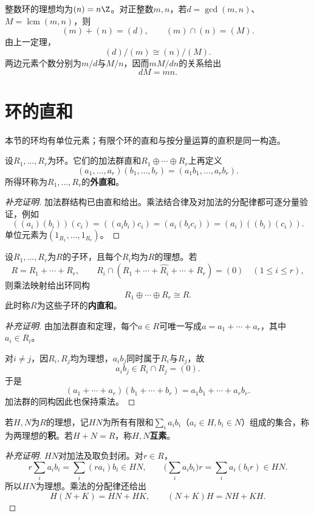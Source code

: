 \begin{example}
整数环的理想均为$(n)=n\Z$。对正整数$m,n$，若$d=\gcd(m,n)$、$M=\operatorname{lcm}(m,n)$，则
\[
(m)+(n)=(d),\qquad (m)\cap(n)=(M).
\]
由上一定理，
\[
(d)/(m)\cong(n)/(M).
\]
两边元素个数分别为$m/d$与$M/n$，因而$mM/dn$的关系给出
\[
dM=mn.
\]
\end{example}

\section{环的直和}

本节的环均有单位元素；有限个环的直和与按分量运算的直积是同一构造。
\begin{definition}
设$R_1,\ldots,R_r$为环。它们的加法群直和$R_1\oplus\cdots\oplus R_r$上再定义
\[
(a_1,\ldots,a_r)(b_1,\ldots,b_r)=(a_1b_1,\ldots,a_rb_r).
\]
所得环称为$R_1,\ldots,R_r$的\textbf{外直和}。
\end{definition}
\begin{proof}[补充证明]
加法群结构已由直和给出。乘法结合律及对加法的分配律都可逐分量验证，例如
\[
((a_i)(b_i))(c_i)=((a_ib_i)c_i)=(a_i(b_ic_i))=(a_i)((b_i)(c_i)).
\]
单位元素为$(1_{R_1},\ldots,1_{R_r})$。
\end{proof}

\begin{theorem}\label{p2:ring-internal-sum}
设$R_1,\ldots,R_r$为$R$的子环，且每个$R_i$均为$R$的理想。若
\[
R=R_1+\cdots+R_r,\qquad
R_i\cap(R_1+\cdots+\widehat{R_i}+\cdots+R_r)=(0)
\quad(1\leq i\leq r),
\]
则乘法映射给出环同构
\[
R_1\oplus\cdots\oplus R_r\cong R.
\]
此时称$R$为这些子环的\textbf{内直和}。
\end{theorem}
\begin{proof}[补充证明]
由加法群直和定理，每个$a\in R$可唯一写成$a=a_1+\cdots+a_r$，其中$a_i\in R_i$。

对$i\ne j$，因$R_i,R_j$均为理想，$a_ib_j$同时属于$R_i$与$R_j$，故
\[
a_ib_j\in R_i\cap R_j=(0).
\]
于是
\[
(a_1+\cdots+a_r)(b_1+\cdots+b_r)
=a_1b_1+\cdots+a_rb_r.
\]
加法群的同构因此也保持乘法。
\end{proof}

\begin{definition}
若$H,N$为$R$的理想，记$HN$为所有有限和$\sum_i a_ib_i$（$a_i\in H,b_i\in N$）组成的集合，称为两理想的\textbf{积}。若$H+N=R$，称$H,N$\textbf{互素}。
\end{definition}
\begin{proof}[补充证明]
$HN$对加法及取负封闭。对$r\in R$，
\[
r\sum_i a_ib_i=\sum_i(ra_i)b_i\in HN,\qquad
\biggl(\sum_i a_ib_i\biggr)r=\sum_i a_i(b_ir)\in HN.
\]
所以$HN$为理想。乘法的分配律还给出
\[
H(N+K)=HN+HK,\qquad (N+K)H=NH+KH.
\]
\end{proof}

